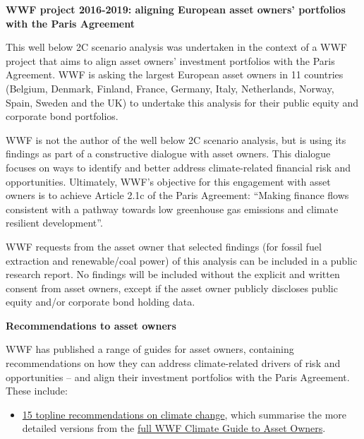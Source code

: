 \documentclass[10pt,table,a4]{article}\usepackage[]{graphicx}\usepackage[]{color}
\begin{document}
	\begin{multicols}{2}
		
		\textbf{WWF project 2016-2019: aligning European asset owners’ portfolios with the Paris Agreement }
		
		This well below 2\degree C scenario analysis was undertaken in the context of a WWF project that aims to align asset owners’ investment portfolios with the Paris Agreement. WWF is asking the largest European asset owners in 11 countries (Belgium, Denmark, Finland, France, Germany, Italy, Netherlands, Norway, Spain, Sweden and the UK) to undertake this analysis for their public equity and corporate bond portfolios.
		
		WWF is not the author of the well below 2\degree C scenario analysis, but is using its findings as part of a constructive dialogue with asset owners. This dialogue focuses on ways to identify and better address climate-related financial risk and opportunities. Ultimately, WWF’s objective for this engagement with asset owners is to achieve Article 2.1c of the Paris Agreement: ``Making finance flows consistent with a pathway towards low greenhouse gas emissions and climate resilient development”.
		
		WWF requests from the asset owner that selected findings (for fossil fuel extraction and renewable/coal power) of this analysis can be included in a public research report. No findings will be included without the explicit and written consent from asset owners, except if the asset owner publicly discloses public equity and/or corporate bond holding data.
		
		
		\textbf{Recommendations to asset owners}
		
		WWF has published a range of guides for asset owners, containing recommendations on how they can address climate-related drivers of risk and opportunities – and align their investment portfolios with the Paris Agreement. These include:
		
		\begin{itemize}
				\item \hyperlink{http://d2ouvy59p0dg6k.cloudfront.net/downloads/wwf\_climate\_guide\_to\_asset\_owners\_summary\_vlr\_with\_links\_update\_april\_18.pdf}{15 topline recommendations on climate change}, which summarise the more detailed versions from the \hyperlink{http://d2ouvy59p0dg6k.cloudfront.net/downloads/wwf\_climate\_guide\_to\_asset\_owners\_\_\_full\_version\_mr\_linked\_update\_april\_18.pdf}{full WWF Climate Guide to Asset Owners}.
			

\end{itemize}
\end{multicols}
\end{document}

